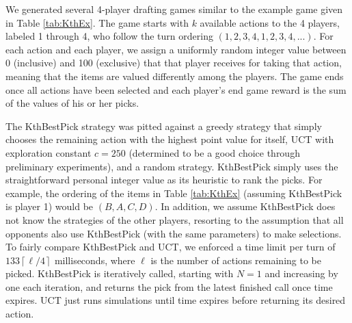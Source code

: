 \documentclass[letterpaper]{article}
\numberwithin{equation}{section}
\numberwithin{theorem}{section}
\numberwithin{lemma}{section}
\numberwithin{df}{section}
\begin{document}
We generated several 4-player drafting games similar to the example game given in Table \ref{tab:KthEx}.  The game starts with $k$ available actions to the 4 players, labeled 1 through 4, who follow the turn ordering $(1,2,3,4,1,2,3,4,...)$.  For each action and each player, we assign a uniformly random integer value between 0 (inclusive) and 100 (exclusive) that that player receives for taking that action, meaning that the items are valued differently among the players.  The game ends once all actions have been selected and each player's end game reward is the sum of the values of his or her picks.   

The KthBestPick strategy was pitted against a greedy strategy that simply chooses the remaining action with the highest point value for itself, UCT with exploration constant $c = 250$ (determined to be a good choice through preliminary experiments), and a random strategy.  KthBestPick simply uses the straightforward personal integer value as its heuristic to rank the picks.  For example, the ordering of the items in Table \ref{tab:KthEx} (assuming KthBestPick is player 1) would be $(B,A,C,D)$.  In addition, we assume KthBestPick does not know the strategies of the other players, resorting to the assumption that all opponents also use KthBestPick (with the same parameters) to make selections.  To fairly compare KthBestPick and UCT, we enforced a time limit per turn of $133 \left \lceil \ell / 4 \right \rceil$ milliseconds, where $\ell$ is the number of actions remaining to be picked.  KthBestPick is iteratively called, starting with $N = 1$ and increasing by one each iteration, and returns the pick from the latest finished call once time expires.  UCT just runs simulations until time expires before returning its desired action.
\end{document}
